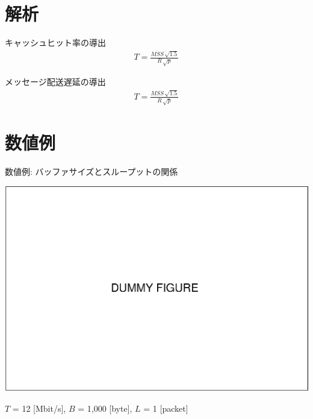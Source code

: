 \documentclass[compress,dvipdfmx,11pt]{beamer}
\begin{document}
\section{解析}
\label{sec:orgc9555a4}

\begin{frame}[label={sec:org5b80ffa}]{キャッシュヒット率の導出}
\begin{align}
T = \frac{MSS \, \sqrt{1.5}}{R \, \sqrt{p}}
\end{align}
\end{frame}

\begin{frame}[label={sec:org2608ff3}]{メッセージ配送遅延の導出}
\begin{align}
T = \frac{MSS \, \sqrt{1.5}}{R \, \sqrt{p}}
\end{align}
\end{frame}

\section{数値例}
\label{sec:org25bc202}

\begin{frame}[label={sec:orgc2b13c9}]{数値例: バッファサイズとスループットの関係}
\begin{center}
\begin{center}
\includegraphics[width=.7\columnwidth]{./figure/dummy.eps}
\end{center}
\end{center}

\begin{center}
\(T\) = 12 [Mbit/s], \(B\) = 1,000 [byte], \(L\) = 1 [packet]
\end{center}
\end{frame}
\end{document}
